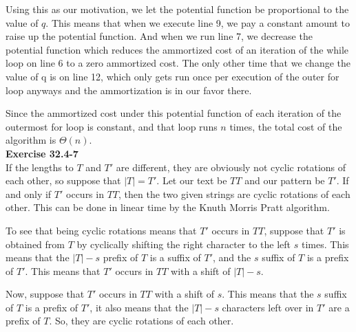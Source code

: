 \documentclass{article}
\begin{document}
Using this as our motivation, we let the potential function be proportional to the value of $q$. This means that when we execute line 9, we pay a constant amount to raise up the potential function. And when we run line 7, we decrease the potential function which reduces the ammortized cost of an iteration of the while loop on line 6 to a zero ammortized cost. The only other time that we change the value of q is on line 12, which only gets run once per execution of the outer for loop anyways and the ammortization is in our favor there.

Since the ammortized cost under this potential function of each iteration of the outermost for loop is constant, and that loop runs $n$ times, the total cost of the algorithm is $\Theta(n)$.\\




\noindent\textbf{Exercise 32.4-7}\\

If the lengths to $T$ and $T'$ are different, they are obviously not cyclic rotations of each other, so suppose that $|T|=T'$. Let our text be $TT$ and our pattern be $T'$. If and only if $T'$ occurs in $TT$, then the two given strings are cyclic rotations of each other. This can be done in linear time by the Knuth Morris Pratt algorithm.

To see that being cyclic rotations means that $T'$ occurs in $TT$, suppose that $T'$ is obtained from $T$ by cyclically shifting the right character to the left $s$ times. This means that the $|T|-s$ prefix of $T$ is a suffix of $T'$, and the $s$ suffix of $T$ is a prefix of $T'$. This means that $T'$ occurs in $TT$ with a shift of $|T|-s$.

Now, suppose that $T'$ occurs in $TT$ with a shift of $s$. This means that the $s$ suffix of $T$ is a prefix of $T'$, it also means that the $|T|-s$ characters left over in $T'$ are a prefix of $T$. So, they are cyclic rotations of each other.\\
\end{document}
